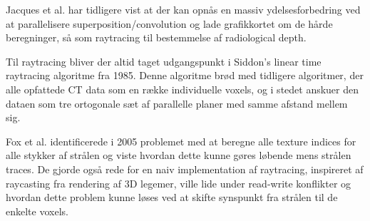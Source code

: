 
Jacques et al.\cite{sc} har tidligere vist at der kan opnås en massiv
ydelsesforbedring ved at parallelisere superposition/convolution og
lade grafikkortet om de hårde beregninger, så som raytracing til
bestemmelse af radiological depth.


Til raytracing bliver der altid taget udgangspunkt i Siddon's linear
time raytracing algoritme fra 1985\cite{siddon}. Denne algoritme brød
med tidligere algoritmer, der alle opfattede CT data som en række
individuelle voxels, og i stedet anskuer den dataen som tre ortogonale
sæt af parallelle planer med samme afstand mellem sig.

Fox et al.\cite{fastraytracing} identificerede i 2005 problemet med at
beregne alle texture indices for alle stykker af strålen og viste
hvordan dette kunne gøres løbende mens strålen traces. De gjorde også
rede for en naiv implementation af raytracing, inspireret af
raycasting fra rendering af 3D legemer, ville lide under read-write
konflikter og hvordan dette problem kunne løses ved at skifte
synspunkt fra strålen til de enkelte voxels.
